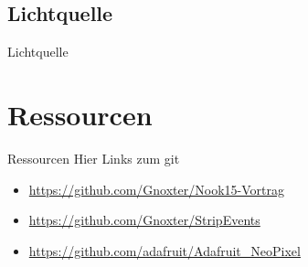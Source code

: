 \documentclass{beamer}
\begin{document}
\subsection{Lichtquelle}
\begin{frame}{Lichtquelle}
\end{frame}

\section{Ressourcen}
\begin{frame}{Ressourcen}
 Hier Links zum git
\begin{itemize}
 \item \url{https://github.com/Gnoxter/Nook15-Vortrag}
 \item \url{https://github.com/Gnoxter/StripEvents}
 \item \url{https://github.com/adafruit/Adafruit_NeoPixel}
\end{itemize}
\end{frame}
\end{document}
